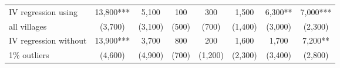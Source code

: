 \documentclass{report}
\begin{document}
\begin{table}[H]
{\begin{tabular}{lccccccc}
\hspace{1em}IV regression using & 13,800*** & 5,100 & 100 & 300 & 1,500 & 6,300** & 7,000***\\
\hspace{1em}\hspace{1em}all villages & (3,700) & (3,100) & (500) & (700) & (1,400) & (3,000) & (2,300)\\
\hspace{1em}IV regression without & 13,900*** & 3,700 & 800 & 200 & 1,600 & 1,700 & 7,200**\\
\hspace{1em}\hspace{1em} 1\% outliers & (4,600) & (4,900) & (700) & (1,200) & (2,300) & (3,400) & (2,800)\\
\bottomrule
\end{tabular}}
\end{table}
\end{document}
